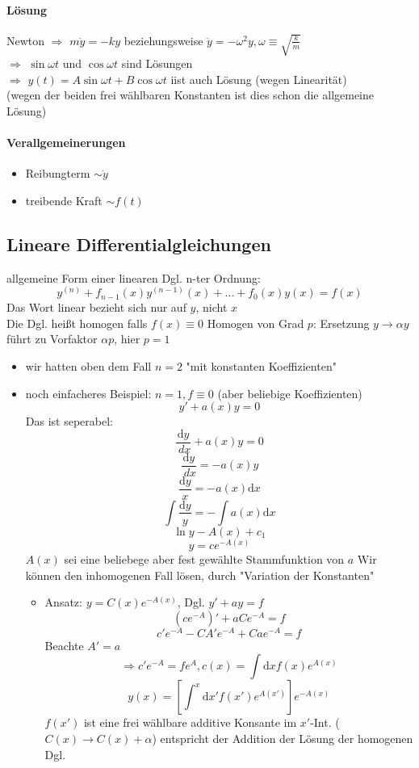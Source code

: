 \documentclass[a4paper]{scrartcl}
\renewcommand{\d}{\mathrm{d}}
\newcommand{\dd}[2]{\frac{\d #1}{\ d#2}}
\theoremstyle{definition}
\theoremstyle{plain}
\theoremstyle{remark}
\begin{document}
\paragraph{Lösung}
\label{sec-3-5-1-2}
Newton $\Rightarrow$ $m\ddot{y} = -ky$ beziehungsweise $\ddot{y} = -\omega^2 y,\omega\equiv\sqrt{\frac{k}{m}}$ \\
     $\Rightarrow$ $\sin{\omega t}$ und $\cos{\omega t}$ sind Lösungen \\
     $\Rightarrow$ $y(t) = A\sin{\omega t} + B\cos{\omega t}$ iist auch Lösung (wegen Linearität) \\
     (wegen der beiden frei wählbaren Konstanten ist dies schon die allgemeine Lösung)
\paragraph{Verallgemeinerungen}
\label{sec-3-5-1-3}
\begin{itemize}
\item Reibungterm $\sim \dot{y}$
\item treibende Kraft $\sim f(t)$
\end{itemize}
\subsection{Lineare Differentialgleichungen}
\label{sec-3-6}
allgemeine Form einer linearen Dgl. n-ter Ordnung:
\[y^{(n)} + f_{n -1}(x)y^{(n - 1)}(x) + \ldots + f_0(x)y(x) = f(x)\]
Das Wort linear bezieht sich nur auf $y$, nicht $x$ \\
   Die Dgl. heißt homogen falls $f(x)\equiv 0$
Homogen von Grad $p$: Ersetzung $y\to\alpha y$ führt zu Vorfaktor $\alpha p$, hier $p = 1$
\begin{itemize}
\item wir hatten oben dem Fall $n = 2$ "mit konstanten Koeffizienten"
\item noch einfacheres Beispiel: $n = 1, f\equiv 0$ (aber beliebige Koeffizienten)
\[y' + a(x)y = 0\]
Das ist seperabel:
\[\dd{y}{x} + a(x) y = 0\]
\[\dd{y}{x} = -a(x) y\]
\[\frac{\d y}{x} = -a(x) \d x\]
\[\int\frac{\d y}{y} = - \int a(x)\d x\]
\[\ln{y} - A(x) + c_1\]
\[y = c e^{-A(x)}\]
$A(x)$ sei eine beliebege aber fest gewählte Stammfunktion von $a$
Wir können den inhomogenen Fall lösen, durch "Variation der Konstanten"
\begin{itemize}
\item Ansatz: $y = C(x)e^{-A(x)}$, Dgl. $y' + ay = f$
       \[(c e^{-A})' + a C e^{-A} = f\]
       \[c' e^{-A} - C A' e^{-A} + C a e^{-A} = f\]
       Beachte $A' = a$
       \[\Rightarrow c'e^{-A} = f e^{A},c(x) = \int\d x f(x) e^{A(x)}\]
       \[y(x) = \left[\int^x\d x' f(x') e^{A(x')}\right] e^{-A(x)}\]
       $f(x')$ ist eine frei wählbare additive Konsante im $x'$-Int. ($C(x)\to C(x) +\alpha$) entspricht der Addition der Lösung der homogenen Dgl.
\end{itemize}
\end{itemize}
\end{document}
